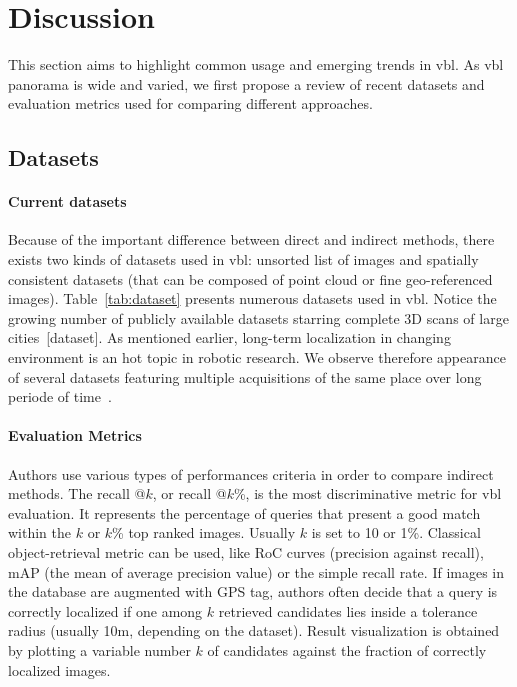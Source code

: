 \section{Discussion}
\label{sec:comparison}
	This section aims to highlight common usage and emerging trends in \ac{vbl}. As \ac{vbl} panorama is wide and varied, we first propose a review of recent datasets and evaluation metrics used for comparing different approaches.
    
	\subsection{Datasets}
		\paragraph{Current datasets} Because of the important difference between direct and indirect methods, there exists two kinds of datasets used in \ac{vbl}: unsorted list of images and spatially consistent datasets (that can be composed of point cloud or fine geo-referenced images). Table~\ref{tab:dataset} presents numerous datasets used in \ac{vbl}. Notice the growing number of publicly available datasets starring complete 3D scans of large cities~[dataset]\citep{Menze2015,Maddern2016,Wang2016}. As mentioned earlier, long-term localization in changing environment is an hot topic in robotic research. We observe therefore appearance of several datasets featuring multiple acquisitions of the same place over long periode of time~\citep{Maddern2016,Carlevaris-Bianco2016,Krajnik2010,Krajnik2014}.



		\paragraph{Evaluation Metrics}
		\label{subsec:evaluation_metric}
			Authors use various types of performances criteria in order to compare indirect methods. The recall @$k$, or recall @$k$\%, is the most discriminative metric for \ac{vbl} evaluation. It represents the percentage of queries that present a good match within the $k$ or $k$\% top ranked images. Usually $k$ is set to 10 or 1\%. Classical object-retrieval metric can be used, like RoC curves (precision against recall), mAP (the mean of average precision value) or the simple recall rate. If images in the database are augmented with GPS tag, authors often decide that a query is correctly localized if one among $k$ retrieved candidates lies inside a tolerance radius (usually 10m, depending on the dataset). Result visualization is obtained by plotting a variable number $k$ of candidates against the fraction of correctly localized images.
			
